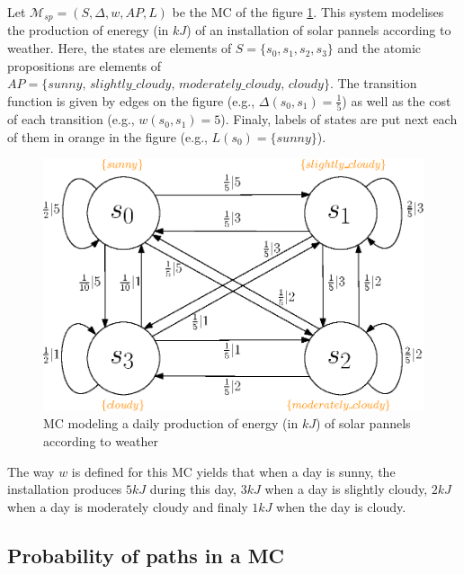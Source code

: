 \begin{example}\label{solar-pannel}
  Let $\mathcal{M}_{sp} = (S, \Delta, w, AP, L)$ be the MC of the figure \ref{MCexample}. This system modelises the production of eneregy (in $kJ$) of
  an installation of solar pannels according to weather.
  Here, the states are elements of $S = \{s_0, s_1, s_2, s_3\}$ and the atomic propositions are elements of $AP = \{sunny, \, slightly\_cloudy, \, moderately\_cloudy, \, cloudy \}$. The transition function is given by edges on the figure (e.g., $\Delta(s_0, s_1) = \frac{1}{5}$) as well as the
  cost of each transition (e.g., $w(s_0, s_1) = 5$). Finaly, labels of states
  are put next each of them in orange in the figure (e.g., $L(s_0) = \{sunny\}$).
  \begin{figure}[h!]
    \centering
    \includegraphics[width=0.6\linewidth]{resources/weather-solar-pannel}
    \caption{MC modeling a daily production of energy (in $kJ$) of solar pannels according to weather}
    \label{MCexample}
  \end{figure}
  The way $w$ is defined for this MC yields that when a day is sunny, the installation produces $5 kJ$ during this day, $3 kJ$ when a day is slightly cloudy, $2 kJ$ when a day is moderately cloudy and finaly $1 kJ$ when the day is cloudy.
\end{example}

\subsection{Probability of paths in a MC}

